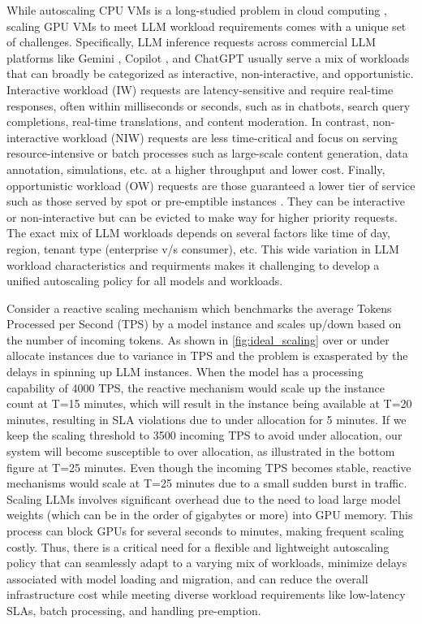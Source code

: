 While autoscaling CPU VMs is a long-studied problem in cloud computing \cite{hadary2020protean,rzadca2020autopilot}, scaling GPU VMs to meet LLM workload requirements comes with a unique set of challenges. Specifically, LLM inference requests across commercial LLM platforms like Gemini \cite{Gemini}, Copilot \cite{Copilot}, and ChatGPT \cite{ChatGPT} usually serve a mix of workloads that can broadly be categorized as interactive, non-interactive, and opportunistic. Interactive workload (IW) requests are latency-sensitive and require real-time responses, often within milliseconds or seconds, such as in chatbots, search query completions, real-time translations, and content moderation. In contrast, non-interactive workload (NIW) requests are less time-critical and focus on serving resource-intensive or batch processes such as large-scale content generation, data annotation, simulations, etc. at a higher throughput and lower cost. Finally, opportunistic workload (OW) requests are those guaranteed a lower tier of service such as those served by spot or pre-emptible instances \cite{miao2024spotserve,wu2024can}. 
They can be interactive or non-interactive but can be evicted to make way for higher priority requests. %
The exact mix of LLM workloads depends on several factors like time of day, region, tenant type (enterprise v/s consumer), etc. This wide variation in LLM workload characteristics and requirments makes it challenging to develop a unified autoscaling policy for all models and workloads. 

Consider a reactive scaling mechanism which benchmarks the average Tokens Processed per Second (TPS) by a model instance and scales up/down based on the number of incoming tokens. As shown in \autoref{fig:ideal_scaling} over or under allocate instances due to variance in TPS and the problem is exasperated by the delays in spinning up LLM instances. %
When the model has a processing capability of 4000 TPS, the reactive mechanism would scale up the instance count at T=15 minutes, which will result in the instance being available at T=20 minutes, resulting in SLA violations due to under allocation for 5 minutes. If we keep the scaling threshold to 3500 incoming TPS to avoid under allocation, our system will become susceptible to over allocation, as illustrated in the bottom figure at T=25 minutes. Even though the incoming TPS becomes stable, reactive mechanisms would scale at T=25 minutes due to a small sudden burst in traffic.
Scaling LLMs involves significant overhead due to the need to load large model weights (which can be in the order of gigabytes or more) into GPU memory. This process can block GPUs for several seconds to minutes, making frequent scaling costly. Thus, there is a critical need for a flexible and lightweight autoscaling policy that can seamlessly adapt to a varying mix of workloads, minimize delays associated with model loading and migration, and can reduce the overall infrastructure cost while meeting diverse workload requirements like low-latency SLAs, batch processing, and handling pre-emption.

